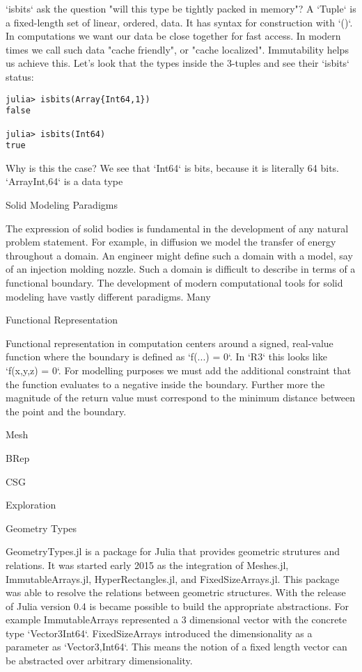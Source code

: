 \documentclass[a4paper]{article}
\begin{document}
`isbits` ask the question "will this type be tightly packed in memory"? A
`Tuple` is a fixed-length set of linear, ordered, data. It has syntax for
construction with `()`. In computations we want our data be close together
for fast access. In modern times we call such data "cache friendly", or
"cache localized". Immutability helps us achieve this. Let's look that the
types inside the 3-tuples and see their `isbits` status:
\begin{lstlisting}
julia> isbits(Array{Int64,1})
false

julia> isbits(Int64)
true
\end{lstlisting}
Why is this the case? We see that `Int64` is bits, because it is literally
64 bits. `Array{Int,64}` is a data type 

 Solid Modeling Paradigms

The expression of solid bodies is fundamental in the development of any
natural problem statement. For example, in diffusion we model the transfer of
energy throughout a domain. An engineer might define such a domain with a
model, say of an injection molding nozzle. Such a domain is difficult to
describe in terms of a functional boundary. The development of modern
computational tools for solid modeling have vastly different paradigms.
Many 

 Functional Representation

Functional representation in computation centers around a signed, real-value
function where the boundary is defined as `f(...) = 0`.
In `R3` this looks like `f(x,y,z) = 0`. For modelling purposes we must add the
additional constraint that the function evaluates to a negative inside the
boundary. Further more the magnitude of the return value must correspond to
the minimum distance between the point and the boundary.


 Mesh


 BRep


 CSG



 Exploration

 Geometry Types

GeometryTypes.jl is a package for Julia that provides geometric strutures and
relations. It was started early 2015 as the integration of Meshes.jl,
ImmutableArrays.jl, HyperRectangles.jl, and FixedSizeArrays.jl. This package
was able to resolve the relations between geometric structures. With the
release of Julia version 0.4 is became possible to build the appropriate
abstractions. For example ImmutableArrays represented a 3 dimensional
vector with the concrete type `Vector3{Int64}`. FixedSizeArrays introduced
the dimensionality as a parameter as `Vector{3,Int64}`. This means the notion
of a fixed length vector can be abstracted over arbitrary dimensionality.
\end{document}
